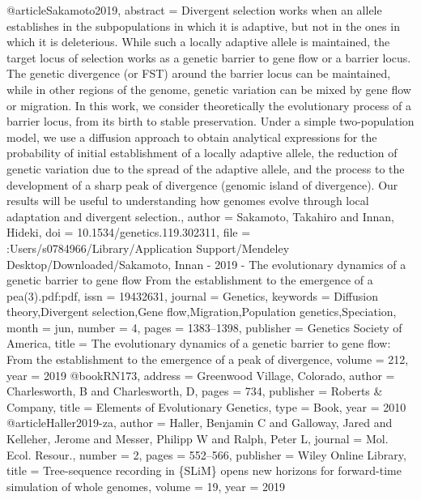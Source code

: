 @article{Sakamoto2019,
abstract = {Divergent selection works when an allele establishes in the subpopulations in which it is adaptive, but not in the ones in which it is deleterious. While such a locally adaptive allele is maintained, the target locus of selection works as a genetic barrier to gene flow or a barrier locus. The genetic divergence (or FST) around the barrier locus can be maintained, while in other regions of the genome, genetic variation can be mixed by gene flow or migration. In this work, we consider theoretically the evolutionary process of a barrier locus, from its birth to stable preservation. Under a simple two-population model, we use a diffusion approach to obtain analytical expressions for the probability of initial establishment of a locally adaptive allele, the reduction of genetic variation due to the spread of the adaptive allele, and the process to the development of a sharp peak of divergence (genomic island of divergence). Our results will be useful to understanding how genomes evolve through local adaptation and divergent selection.},
author = {Sakamoto, Takahiro and Innan, Hideki},
doi = {10.1534/genetics.119.302311},
file = {:Users/s0784966/Library/Application Support/Mendeley Desktop/Downloaded/Sakamoto, Innan - 2019 - The evolutionary dynamics of a genetic barrier to gene flow From the establishment to the emergence of a pea(3).pdf:pdf},
issn = {19432631},
journal = {Genetics},
keywords = {Diffusion theory,Divergent selection,Gene flow,Migration,Population genetics,Speciation},
month = {jun},
number = {4},
pages = {1383--1398},
publisher = {Genetics Society of America},
title = {{The evolutionary dynamics of a genetic barrier to gene flow: From the establishment to the emergence of a peak of divergence}},
volume = {212},
year = {2019}
}
@book{RN173,
address = {Greenwood Village, Colorado},
author = {Charlesworth, B and Charlesworth, D},
pages = {734},
publisher = {Roberts {\&} Company},
title = {{Elements of Evolutionary Genetics}},
type = {Book},
year = {2010}
}
@article{Haller2019-za,
author = {Haller, Benjamin C and Galloway, Jared and Kelleher, Jerome and Messer, Philipp W and Ralph, Peter L},
journal = {Mol. Ecol. Resour.},
number = {2},
pages = {552--566},
publisher = {Wiley Online Library},
title = {{Tree-sequence recording in {\{}SLiM{\}} opens new horizons for forward-time simulation of whole genomes}},
volume = {19},
year = {2019}
}
